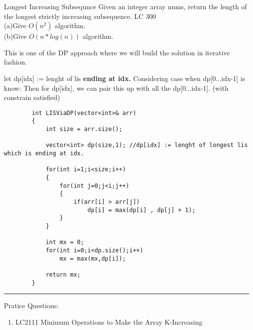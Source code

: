 \begin{problem}{Longest Increasing Subsequnce}
    Given an integer array nums, return the length of the longest strictly increasing subsequence. LC 300\\
    (a)Give $O(n^2)$ algorithm.\\
    (b)Give $O(n*log(n))$ algorithm.
\end{problem}

\begin{solution}
    \obeylines
    \obeyspaces
    This is one of the DP approach where we will build the solution in iterative fashion.

    let dp[idx] := lenght of lis \textbf{ending at idx.}
    \medskip
    Considering case when dp[0...idx-1] is know:
    Then for dp[idx], we can pair this up with all the dp[0...idx-1]. (with constrain satisfied)

    \begin{verbatim}
        int LISViaDP(vector<int>& arr)
        {
            int size = arr.size();
            
            vector<int> dp(size,1); //dp[idx] := lenght of longest lis which is ending at idx.
            
            for(int i=1;i<size;i++)
            {
                for(int j=0;j<i;j++)
                {
                    if(arr[i] > arr[j])
                        dp[i] = max(dp[i] , dp[j] + 1);
                }
            }
            
            int mx = 0;
            for(int i=0;i<dp.size();i++)
                mx = max(mx,dp[i]); 
            
            return mx;
        }
    \end{verbatim}
    

\end{solution}


\begin{solution}
    \vspace{2mm}
    \hrule
    
\end{solution}

Pratice Questions:
\begin{enumerate}
    \item LC2111  Minimum Operations to Make the Array K-Increasing
\end{enumerate}
